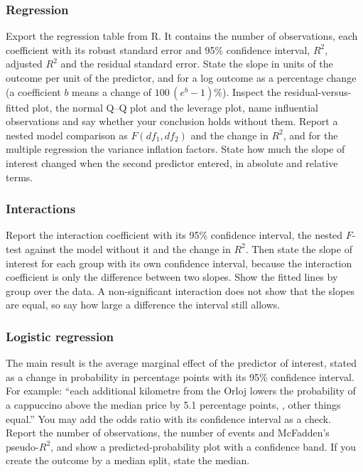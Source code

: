 \documentclass[11pt,a4paper]{article}
\begin{document}
\subsubsection*{Regression}

Export the regression table from R. It contains the number of observations, each coefficient with its robust standard error and 95\% confidence interval, $R^2$, adjusted $R^2$ and the residual standard error. State the slope in units of the outcome per unit of the predictor, and for a log outcome as a percentage change (a coefficient $b$ means a change of $100\,(e^{b}-1)\%$). Inspect the residual-versus-fitted plot, the normal Q--Q plot and the leverage plot, name influential observations and say whether your conclusion holds without them. Report a nested model comparison as $F(df_1,df_2)$ and the change in $R^2$, and for the multiple regression the variance inflation factors. State how much the slope of interest changed when the second predictor entered, in absolute and relative terms.

\subsubsection*{Interactions}

Report the interaction coefficient with its 95\% confidence interval, the nested $F$-test against the model without it and the change in $R^2$. Then state the slope of interest for each group with its own confidence interval, because the interaction coefficient is only the difference between two slopes. Show the fitted lines by group over the data. A non-significant interaction does not show that the slopes are equal, so say how large a difference the interval still allows.

\subsubsection*{Logistic regression}

The main result is the average marginal effect of the predictor of interest, stated as a change in probability in percentage points with its 95\% confidence interval. For example: ``each additional kilometre from the Orloj lowers the probability of a cappuccino above the median price by 5.1 percentage points, , other things equal.'' You may add the odds ratio with its confidence interval as a check. Report the number of observations, the number of events and McFadden's pseudo-$R^2$, and show a predicted-probability plot with a confidence band. If you create the outcome by a median split, state the median.
\end{document}
